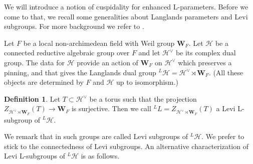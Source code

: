 \documentclass[11pt]{amsart}
\theoremstyle{definition}
\newtheorem{defn}[thm]{Definition}
\newcommand{\mb}{\mathbf}
\def\cH{{\mathcal H}}
\begin{document}
We will introduce a notion of cuspidality for enhanced L-parameters. 
Before we come to that, we recall some generalities about Langlands parameters
and Levi subgroups. For more background we refer to \cite{Bor,Vog,ABPS7}.

Let $F$ be a local non-archimedean field with Weil group $\mb W_F$. Let
$\cH$ be a connected reductive algebraic group over $F$ and let $\cH^\vee$
be its complex dual group. The data for $\cH$ provide an action of $\mb W_F$
on $\cH^\vee$ which preserves a pinning, and that gives the Langlands dual group 
${}^L \cH = \cH^\vee \rtimes \mb W_F$. (All these objects are determined by
$F$ and $\cH$ up to isomorphism.) 

\begin{defn}\label{def:7.6}
Let $T \subset \cH^\vee$ be a torus such that the projection 
$Z_{\cH^\vee \rtimes \mb W_F}(T) \to \mb W_F$ is surjective. Then we call
${}^L L = Z_{\cH^\vee \rtimes \mb W_F}(T)$ a Levi L-subgroup of ${}^L \cH$. 
\end{defn}
We remark that in \cite{Bor} such groups are called Levi subgroups of 
${}^L \cH$. We prefer to stick to the connectedness of Levi subgroups.
An alternative characterization of Levi L-subgroups of ${}^L \cH$ is as follows.
\end{document}
